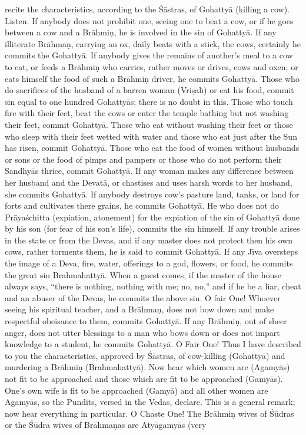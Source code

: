 recite the characteristics, according to the \'S\=astras, of Gohatty\=a (killing a cow). Listen. If anybody does not prohibit one, seeing one to beat a cow, or if he goes between a cow and a Br\=ahmi\d{n}, he is involved in the sin of Gohatty\=a. If any illiterate Br\=ahma\d{n}, carrying an ox, daily beats with a stick, the cows, certainly he commits the Gohatty\=a. If anybody gives the remains of another's meal to a cow to eat, or feeds a Br\=ahmi\d{n} who carries, rather moves or drives, cows and oxen; or eats himself the food of such a Br\=ahmi\d{n} driver, he commits Gohatty\=a. Those who do sacrifices of the husband of a barren woman (Vri\d{s}al\={\i}) or eat his food, commit sin equal to one hundred Gohatty\=as; there is no doubt in this. Those who touch fire with their feet, beat the cows or enter the temple bathing but not washing their feet, commit Gohatty\=a. Those who eat without washing their feet or those who sleep with their feet wetted with water and those who eat just after the Sun has risen, commit Gohatty\=a. Those who eat the food of women without husbands or sons or the food of pimps and pampers or those who do not perform their Sandhy\=as thrice, commit Gohatty\=a. If any woman makes any difference between her husband and the Devat\=a, or chastises and uses harsh words to her husband, she commits Gohatty\=a. If anybody destroys cow's pasture land, tanks, or land for forts and cultivates there grains, he commits Gohatty\=a. He who does not do Pr\=aya\'schitta (expiation, atonement) for the expiation of the sin of Gohatty\=a done by his son (for fear of his son's life), commits the sin himself. If any trouble arises in the state or from the Devas, and if any master does not protect then his own cows, rather torments them, he is said to commit Gohatty\=a. If any J\={\i}va oversteps the image of a Deva, fire, water, offerings to a god, flowers, or food, he commits the great sin Brahmahatty\=a. When a guest comes, if the master of the house always says, ``there is nothing, nothing with me; no, no,'' and if he be a liar, cheat and an abuser of the Devas, he commits the above sin. O fair One! Whoever seeing his spiritual teacher, and a Br\=ahma\d{n}, does not bow down and make respectful obeisance to them, commits Gohatty\=a. If any Br\=ahmi\d{n}, out of sheer anger, does not utter blessings to a man who bows down or does not impart knowledge to a student, he commits Gohatty\=a. O Fair One! Thus I have described to you the characteristics, approved by \'S\=astras, of cow-killing (Gohatty\=a) and murdering a Br\=ahmi\d{n} (Brahmahatty\=a). Now hear which women are (Agamy\=as) not fit to be approached and those which are fit to be approached (Gamy\=as). One's own wife is fit to be approached (Gamy\=a) and all other women are Agamy\=as, so the Pundits, versed in the Vedas, declare. This is a general remark; now hear everything in particular. O Chaste One! The Br\=ahmi\d{n} wives of \'S\=udras or the \'S\=udra wives of Br\=ahma\d{n}as are Aty\=agamy\=as (very

